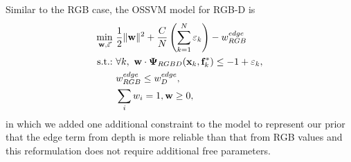 \documentclass[10pt,journal,compsoc]{newIEEEtran}
\begin{document}
Similar to the RGB case, the OSSVM model for RGB-D is
\begin{equation}\label{EQ:OSSVM_RGBD_p}
\begin{split}
\min_{\mathbf{w},\vec{\varepsilon}}~& {1\over2}\|\mathbf{w}\|^2 + {C\over N}\left(\sum_{k=1}^N \varepsilon_k\right) - w^{edge}_{RGB} \\
\hbox{s.t.:}~&  \forall k,~ \mathbf{w}\cdot\mathbf{\Psi}_{RGBD}(\mathbf{x}_k,\mathbf{f}^*_k)\leq -1+\varepsilon_k, \\
&  w^{edge}_{RGB}\leq w^{edge}_{D}, \\
&  \sum_i w_i=1, \mathbf{w}\geq 0, \\
\end{split}
\end{equation}
in which we added one additional constraint to the model to represent our prior that the edge term from depth is more reliable than that from RGB values and this reformulation does not require additional free parameters.
\end{document}
